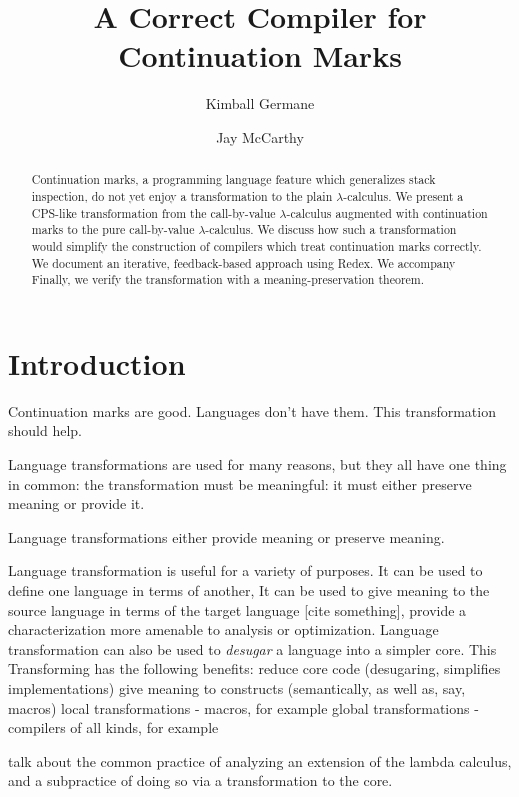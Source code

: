 \documentclass{llncs}
\title{A Correct Compiler for Continuation Marks}
\author{Kimball Germane \and Jay McCarthy}
\institute{Brigham Young University}
\begin{document}
\maketitle

\begin{abstract}
Continuation marks, a programming language feature which generalizes stack inspection, do not yet enjoy a transformation to the plain $\lambda$-calculus. We present a CPS-like transformation from the call-by-value $\lambda$-calculus augmented with continuation marks to the pure call-by-value $\lambda$-calculus. We discuss how such a transformation would simplify the construction of compilers which treat continuation marks correctly. We document an iterative, feedback-based approach using Redex. We accompany Finally, we verify the transformation with a meaning-preservation theorem.
\end{abstract}

\section{Introduction}

Continuation marks are good.
Languages don't have them.
This transformation should help.


Language transformations are used for many reasons, but they all have one thing in common: the transformation must be meaningful: it must either preserve meaning or provide it.

Language transformations either provide meaning or preserve meaning.

Language transformation is useful for a variety of purposes. It can be used to define one language in terms of another, It can be used to give meaning to the source language in terms of the target language [cite something], provide a characterization more amenable to analysis or optimization. Language transformation can also be used to \emph{desugar} a language into a simpler core. This 
Transforming has the following benefits:
reduce core code (desugaring, simplifies implementations)
give meaning to constructs (semantically, as well as, say, macros)
local transformations - macros, for example
global transformations - compilers of all kinds, for example

talk about the common practice of analyzing an extension of the lambda calculus, and a subpractice of doing so via a transformation to the core.
\end{document}
